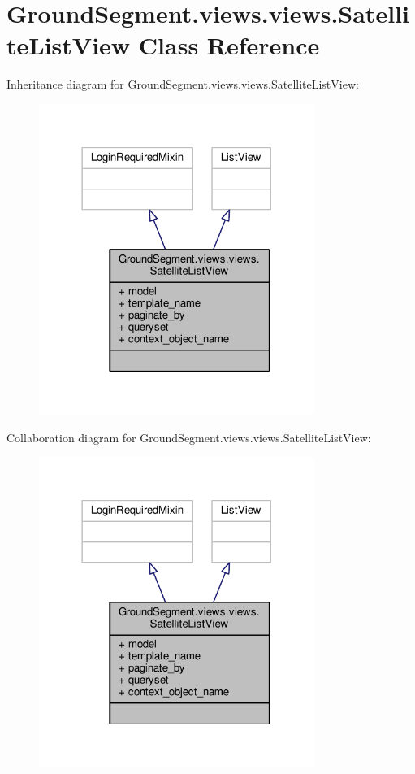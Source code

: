 \hypertarget{class_ground_segment_1_1views_1_1views_1_1_satellite_list_view}{}\section{Ground\+Segment.\+views.\+views.\+Satellite\+List\+View Class Reference}
\label{class_ground_segment_1_1views_1_1views_1_1_satellite_list_view}


Inheritance diagram for Ground\+Segment.\+views.\+views.\+Satellite\+List\+View\+:\nopagebreak
\begin{figure}[H]
\begin{center}
\leavevmode
\includegraphics[width=254pt]{class_ground_segment_1_1views_1_1views_1_1_satellite_list_view__inherit__graph}
\end{center}
\end{figure}


Collaboration diagram for Ground\+Segment.\+views.\+views.\+Satellite\+List\+View\+:\nopagebreak
\begin{figure}[H]
\begin{center}
\leavevmode
\includegraphics[width=254pt]{class_ground_segment_1_1views_1_1views_1_1_satellite_list_view__coll__graph}
\end{center}
\end{figure}

